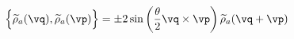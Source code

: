 \begin{equation}
     \Big\{\widetilde{\rho}_{a}(\vq),\widetilde{\rho}_{a}(\vp)\Big\}
     =
    \pm 2\sin\left(\frac{\theta}{2}\vq\times\vp\right)
     \widetilde{\rho}_{a}(\vq+\vp)
     \label{trigonalg}
\end{equation}

